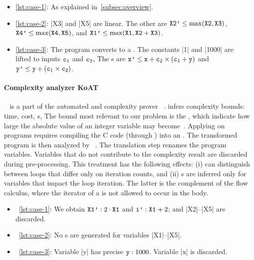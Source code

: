 \begin{itemize}

\item \autoref{lst:case-1}: As explained in~\autoref{subsec:overview}.

\item \autoref{lst:case-2}: \pr|X3| and \pr|X5| are linear.
The other are
\(\prm{X2'}\leq\max(\prm{X2},\prm{X3})\),
\( \prm{X4'}\leq\max(\prm{X4},\prm{X5})\), and
\(\prm{X1'}\leq\max(\prm{X1},\prm{X2}+\prm{X3})\).

\item \autoref{lst:case-3}: The program converts to a . The
constants \pr|1| and \pr|1000| are lifted to inputs \(\prm{c}_1\) and
\(\prm{c}_2\), \resp The s are
\(\prm{x'}\leq\prm{x}+\prm{c}_2\times(\prm{c}_1 + \prm{y})\) and
\(\prm{y'}\leq\prm{y}+(\prm{c}_1\times\prm{c}_2)\).

\end{itemize}

\paragraph*{Complexity analyzer KoAT}
~\cite{koat} is a part of the automated  and
complexity prover ~\cite{giesl2016}.  infers complexity
bounds: time, cost, s, \etc The bound
most relevant to our problem is the \emph{}, which indicate how
large the absolute value of an integer variable may become~\cite{lommen2023}.
Applying  on  programs requires compiling the C code (through
) into an . The transformed program is
then analyzed by ~\cite{giesl2022}. The translation step renames the
program variables. Variables that do not contribute to the complexity result are
discarded during pre-processing. This treatment has the following effects: (i)
 can distinguish between loops that differ only on iteration counts,
and (ii) s are inferred only for variables that impact the loop
iteration. The latter is the complement of the flow
calculus, where the iterator of a  is not
allowed to occur in the body.

\begin{itemize}
\item~\autoref{lst:case-1}: We obtain \(\prm{X1'} : 2 \cdot \prm{X1}\) and
\(\prm{i'}: \prm{X1}+ 2\); and \pr|X2|--\pr|X5| are discarded.

\item~\autoref{lst:case-2}: No s are generated for variables
\pr|X1|--\pr|X5|.

\item~\autoref{lst:case-3}: Variable \pr|y| has precise 
\(\prm{y}: 1000\). Variable \pr|x| is discarded.
\end{itemize}

